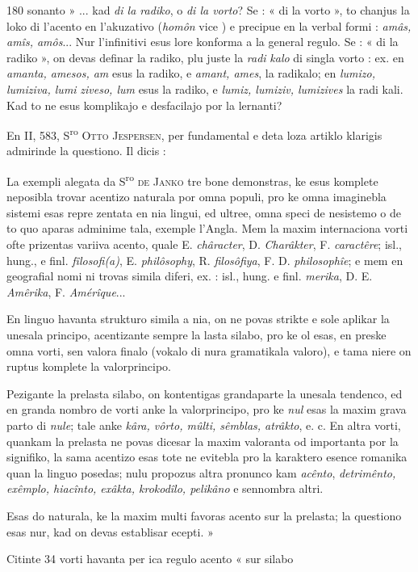 \begin{VUpage}[184]{180}
\VUcontinue
sonanto » ... kad \textit{di la radiko}, o \textit{di la vorto}? Se : « di la\nl
vorto », to chanjus la loko di l'acento en l'akuzativo (\textit{homôn}\nl
vice \textit{}) e precipue en la verbal formi : \textit{amâs, amîs, amôs}...\nl
Nur l'infinitivi esus lore konforma a la general regulo. Se :\nl
« di la radiko », on devas definar la radiko, plu juste la \textit{radi}\cc
\textit{kalo} di singla vorto : ex. en \textit{amanta, amesos, am} esus la\nl
radiko, e \textit{amant, ames}, la radikalo; en \textit{lumizo, lumiziva, lumi}\cc
\textit{ziveso, lum} esus la radiko, e \textit{lumiz, lumiziv, lumizives} la radi\cc
kali. Kad to ne esus komplikajo e desfacilajo por la lernanti?\parplein

En II, 583, S\textsuperscript{ro} \textsc{Otto Jespersen}, per fundamental e deta\cc
loza artiklo klarigis admirinde la questiono. Il dicis :

La exempli alegata da S\textsuperscript{ro} \textsc{de Janko} tre bone demonstras,\nl
ke esus komplete neposibla trovar acentizo naturala por\nl
omna populi, pro ke omna imaginebla sistemi esas repre\cc
zentata en nia lingui, ed ultree, omna speci de nesistemo o\nl
de to quo aparas adminime tala, exemple l'Angla. Mem la\nl
maxim internaciona vorti ofte prizentas variiva acento, quale\nl
E. \textit{châracter}, D. \textit{Charâkter}, F. \textit{caractêre}; isl., hung., e finl.\nl
\textit{fîlosofi(a)}, E. \textit{philôsophy}, R. \textit{filosôfiya}, F. D. \textit{philosophîe}; e\nl
mem en geografial nomi ni trovas simila diferi, ex. : isl., hung.\nl
e finl. \textit{merika}, D. E. \textit{Amêrika}, F. \textit{Amérîque}...

En linguo havanta strukturo simila a nia, on ne povas\nl
strikte e sole aplikar la unesala principo, acentizante sempre\nl
la lasta silabo, pro ke ol esas, en preske omna vorti, sen\cc
valora finalo (vokalo di nura gramatikala valoro), e tama\cc
niere on ruptus komplete la valorprincipo.

Pezigante la prelasta silabo, on kontentigas grandaparte\nl
la unesala tendenco, ed en granda nombro de vorti anke\nl
la valorprincipo, pro ke \textit{nul} esas la maxim grava parto di\nl
\textit{nule}; tale anke \textit{kâra, vôrto, mûlti, sêmblas, atrâkto}, e. c. En\nl
altra vorti, quankam la prelasta ne povas dicesar la maxim\nl
valoranta od importanta por la signifiko, la sama acentizo\nl
esas tote ne evitebla pro la karaktero esence romanika quan\nl
la linguo posedas; nulu propozus altra pronunco kam \textit{acênto},\nl
\textit{detrimênto, exêmplo, hiacînto, exâkta, krokodîlo, pelikâno} e\nl
sennombra altri.

Esas do naturala, ke la maxim multi favoras acento sur\nl
la prelasta; la questiono esas nur, kad on devas establisar\nl
ecepti. »

Citinte 34 vorti havanta per ica regulo acento « sur silabo\parplein
\end{VUpage}

